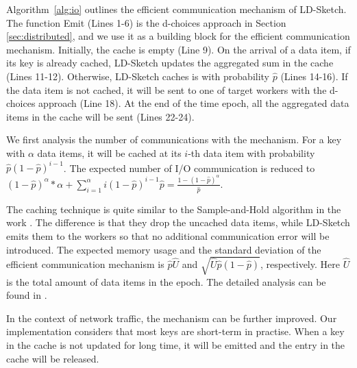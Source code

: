 Algorithm~\ref{alg:io} outlines the efficient communication mechanism of LD-Sketch.
The function {\sc Emit} (Lines 1-6) is the d-choices approach in Section \ref{sec:distributed},
and we use it as a building block for the efficient communication mechanism.
Initially, the cache is empty (Line 9).
On the arrival of a data item, if its key is already cached, LD-Sketch updates the aggregated sum in the cache (Lines 11-12).
Otherwise, LD-Sketch caches is with probability $\hat{p}$ (Lines 14-16).
If the data item is not cached, it will be sent to one of target workers with the d-choices approach (Line 18).
At the end of the time epoch, all the aggregated data items in the cache will be sent (Lines 22-24).

We first analysis the number of communications with the mechanism.
For a key with $\alpha$ data items, it will be cached at its $i$-th data item with probability $\hat{p}(1-\hat{p})^{i-1}$.
The expected number of I/O communication is reduced to
$(1-\hat{p})^{\alpha}*\alpha + \sum_{i=1}^{\alpha}i(1-\hat{p})^{i-1}\hat{p} = \frac{1-(1-\hat{p})^{\alpha}}{\hat{p}}$.
%

The caching technique is quite similar to the Sample-and-Hold algorithm in the work \cite{Estan2003}.
The difference is that they drop the uncached data items, while LD-Sketch emits them to the workers
so that no additional communication error will be introduced.
The expected memory usage and the standard deviation of the efficient communication mechanism is $\hat{p}\hat{U}$ and $\sqrt{\hat{U}\hat{p}(1-\hat{p})}$,
respectively.
Here $\hat{U}$ is the total amount of data items in the epoch.
The detailed analysis can be found in \cite{Estan2003}.

In the context of network traffic, the mechanism can be further improved.
Our implementation considers that most keys are short-term in practise.
When a key in the cache is not updated for long time, it will be emitted and the entry in the cache will be released.

%
